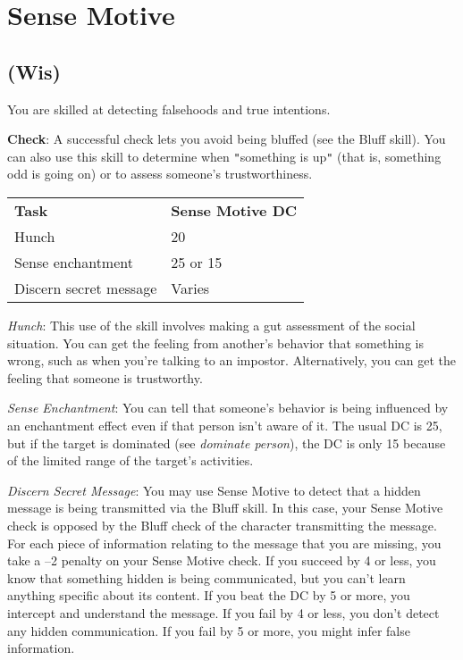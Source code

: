 \section{Sense Motive}

\label{f0}
\subsection{(Wis)}

				
You are skilled at detecting falsehoods and true intentions.
				
\textbf{Check}: A successful check lets you avoid being bluffed (see the Bluff skill). You can also use this skill to determine when \texttt{{}"{}}something is up\texttt{{}"{}} (that is, something odd is going on) or to assess someone's trustworthiness. 
\begin{table}
 \sffamily
 \begin{tabular}{ll}
\textbf{Task} & \textbf{Sense Motive DC}\\
Hunch & 20\\
Sense enchantment & 25 or 15\\
Discern secret message & Varies\\  
 \end{tabular}

\end{table}

				
\textit{Hunch}: This use of the skill involves making a gut assessment of the social situation. You can get the feeling from another's behavior that something is wrong, such as when you're talking to an impostor. Alternatively, you can get the feeling that someone is trustworthy.
				
\textit{Sense Enchantment}: You can tell that someone's behavior is being influenced by an enchantment effect even if that person isn't aware of it. The usual DC is 25, but if the target is dominated (see \textit{dominate person}), the DC is only 15 because of the limited range of the target's activities.
				
\textit{Discern Secret Message}: You may use Sense Motive to detect that a hidden message is being transmitted via the Bluff skill. In this case, your Sense Motive check is opposed by the Bluff check of the character transmitting the message. For each piece of information relating to the message that you are missing, you take a --2 penalty on your Sense Motive check. If you succeed by 4 or less, you know that something hidden is being communicated, but you can't learn anything specific about its content. If you beat the DC by 5 or more, you intercept and understand the message. If you fail by 4 or less, you don't detect any hidden communication. If you fail by 5 or more, you might infer false information.
				
